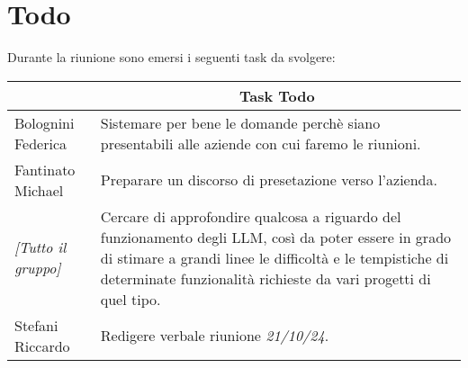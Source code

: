 \section{Todo}

Durante la riunione sono emersi i seguenti task da svolgere:

\vspace{0.5cm}

\begin{table}[htbp]
\begin{tabular}{|p{}|p{}|}
    \hline
    \rowcolor[gray]{0.9}
    \multicolumn{1}{|c|}{\textbf{Assegnatario}} & \multicolumn{1}{|c|}{\textbf{Task Todo}} \\
    \hline
    Bolognini Federica & Sistemare per bene le domande perchè siano presentabili alle aziende con cui faremo le riunioni. \\
    \hline
    Fantinato Michael & Preparare un discorso di presetazione verso l'azienda. \\
    \hline
    \emph{[Tutto il gruppo]} & Cercare di approfondire qualcosa a riguardo del funzionamento degli LLM, così da poter essere in grado di stimare a grandi linee le difficoltà e le tempistiche di determinate funzionalità richieste da vari progetti di quel tipo. \\
    \hline
    Stefani Riccardo & Redigere verbale riunione \emph{21/10/24}. \\
    \hline
\end{tabular}
\end{table}

